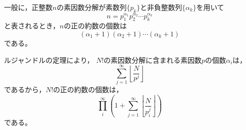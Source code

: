 \documentclass{article}
\begin{document}
一般に，正整数$n$の素因数分解が素数列$\{p_k\}$と非負整数列$\{\alpha_k\}$を用いて
$$n = p_1^{\alpha_1} p_2^{\alpha_2} \cdots p_k^{\alpha_k}$$
と表されるとき，$n$の正の約数の個数は
$$(\alpha_1 + 1) (\alpha_2 + 1) \cdots (\alpha_k + 1)$$
である。

ルジャンドルの定理により，
$N!$の素因数分解に含まれる素因数$p$の個数$\alpha_i$は，
\begin{equation}
    \sum_{j = 1}^\infty \left\lfloor \dfrac{N}{p^j} \right\rfloor \nonumber
\end{equation}
であるから，$N!$の正の約数の個数は，
\begin{equation}
    \prod_{i}^\infty ( 1 + \sum_{j = 1}^\infty \left\lfloor \dfrac{N}{p_i^j} \right\rfloor ) \nonumber
\end{equation}
である。
\end{document}
